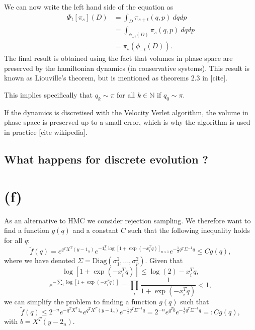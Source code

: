 \documentclass[a4paper, 12pt,oneside]{article}
\begin{document}
		We can now write the left hand side of the equation as
		\begin{align}
			\Phi_t[\pi_s](D)&=\int_D \pi_{s+t}(q,p)\ dqdp \\
				&=\int_{\phi_{-t}(D)}\pi_{s}(q,p)\ dqdp \\
				&=\pi_s(\phi_{-t}(D)).
		\end{align}
		The final result is obtained using the fact that volumes in phase space are preserved by the hamiltonian dynamics (in conservative systems). This result is known as Liouville's theorem, but is mentioned as theorems 2.3 in [cite].

		This implies specifically that $q_k\sim\pi$ for all $k\in\mathbb{N}$ if $q_0\sim \pi$. 

		If the dynamics is discretised with the Velocity Verlet algorithm, the volume in phase space is preserved up to a small error, which is why the algorithm is used in practice [cite wikipedia]. 
        \subsection{What happens for discrete evolution ?}
	\section{(f)}
	As an alternative to HMC we consider rejection sampling. We therefore want to find a function $g(q)$ and a constant $C$ such that the following inequality holds for all $q$:
	\begin{equation}
		\tilde{f}(q) = e^{q^TX^T(y-1_{n})}e^{-1_{n}^T \log[1+\exp(-x_i^Tq)]_{n\times 1}}e^{-\frac{1}{2}q^T\Sigma^{-1} q} \leq Cg(q),
	\end{equation}
	where we have denoted $\Sigma=\text{Diag}(\sigma_1^2,...,\sigma_p^2)$.
	Given that 
	\begin{equation}
		\log[1+\exp(-x_i^Tq)] \le \log(2) - x_i^Tq,
	\end{equation}
	\begin{equation}
		e^{-\sum_i \log[1+\exp(-x_i^Tq)]} = \prod_i \frac{1}{1+\exp(-x_i^Tq)}<1,
	\end{equation}
	we can simplify the problem to finding a function $g(q)$ such that
	\begin{equation}
		\tilde{f}(q) \le 2^{-n}e^{-q^TX^T 1_n} e^{q^TX^T(y-1_{n})}e^{-\frac{1}{2}q^T\Sigma^{-1} q} = 2^{-n}e^{q^Tb}e^{-\frac{1}{2}q^T\Sigma^{-1} q}
		=: Cg(q),
	\end{equation}
	with $b=X^T(y-2_{n})$. 
\end{document}
